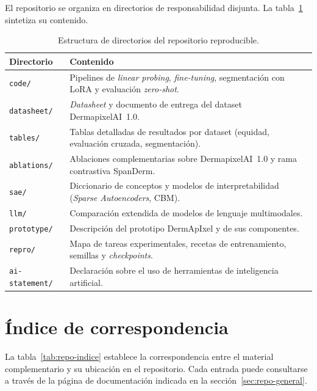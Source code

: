 El repositorio se organiza en directorios de responsabilidad
disjunta. La tabla~\ref{tab:repo-estructura} sintetiza su
contenido.

\begin{table}[H]
\centering
\footnotesize
\setlength{\tabcolsep}{5pt}
\renewcommand{\arraystretch}{1.05}
\caption{Estructura de directorios del repositorio reproducible.}
\label{tab:repo-estructura}
\begin{tabular}{ll}
\hline
Directorio & Contenido \\
\hline
\texttt{code/} & Pipelines de \emph{linear probing}, \emph{fine-tuning}, segmentación con LoRA y evaluación \emph{zero-shot}. \\
\texttt{datasheet/} & \emph{Datasheet} y documento de entrega del dataset DermapixelAI~1.0. \\
\texttt{tables/} & Tablas detalladas de resultados por dataset (equidad, evaluación cruzada, segmentación). \\
\texttt{ablations/} & Ablaciones complementarias sobre DermapixelAI~1.0 y rama contrastiva SpanDerm. \\
\texttt{sae/} & Diccionario de conceptos y modelos de interpretabilidad (\emph{Sparse Autoencoders}, CBM). \\
\texttt{llm/} & Comparación extendida de modelos de lenguaje multimodales. \\
\texttt{prototype/} & Descripción del prototipo DermApIxel y de sus componentes. \\
\texttt{repro/} & Mapa de tareas experimentales, recetas de entrenamiento, semillas y \emph{checkpoints}. \\
\texttt{ai-statement/} & Declaración sobre el uso de herramientas de inteligencia artificial. \\
\hline
\end{tabular}
\end{table}

\section{Índice de correspondencia}
\label{sec:repo-indice}

La tabla~\ref{tab:repo-indice} establece la correspondencia entre el
material complementario y su ubicación en el repositorio. Cada
entrada puede consultarse a través de la página de documentación
indicada en la sección~\ref{sec:repo-general}.

